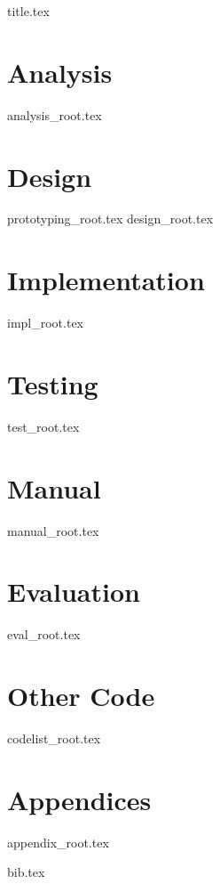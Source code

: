 \documentclass[a4paper, 12pt]{scrartcl}
\begin{document}
{title.tex}

\begin{footnotesize}
\tableofcontents
\end{footnotesize}

\pagebreak

\section{Analysis}
{analysis_root.tex}
\pagebreak

\section{Design}
{prototyping_root.tex}
{design_root.tex}
\pagebreak

\section{Implementation}
{impl_root.tex}
\pagebreak

\section{Testing}
{test_root.tex}
\pagebreak

\section{Manual}
{manual_root.tex}
\pagebreak

\section{Evaluation}
{eval_root.tex}
\pagebreak

\section{Other Code}
{codelist_root.tex}
\pagebreak

\appendix
\section*{Appendices}
\renewcommand{\thesubsection}{\Alph{subsection}}
{appendix_root.tex}
\pagebreak

{bib.tex}
\end{document}

